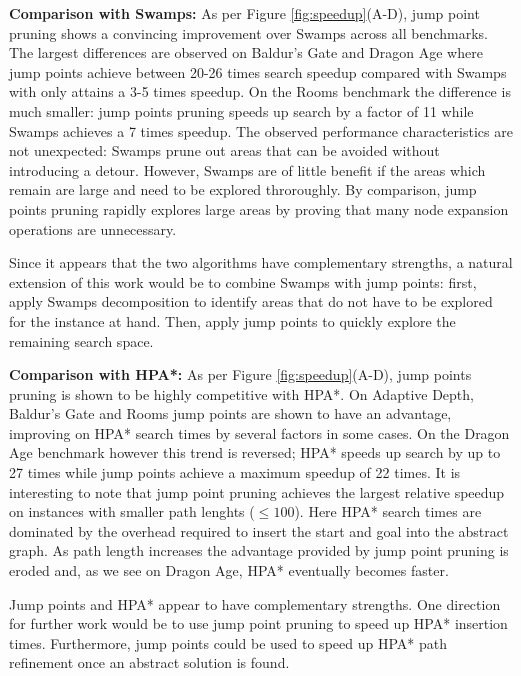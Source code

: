 \textbf{Comparison with Swamps: }
As per Figure \ref{fig:speedup}(A-D), jump point pruning shows a convincing
improvement over Swamps across all benchmarks. 
The largest differences are observed on Baldur's Gate and Dragon Age where jump 
points achieve between 20-26 times search speedup compared with Swamps with 
only attains a 3-5 times speedup.
On the Rooms benchmark the difference is much smaller: jump points pruning
speeds up search by a factor of 11 while Swamps achieves a 7 times
speedup.
The observed performance characteristics are not unexpected: Swamps prune out
areas that can be avoided without introducing a detour. However, Swamps are of
little benefit if the areas which remain are large and need to be explored 
throroughly.
By comparison, jump points pruning rapidly explores large areas by proving
that many node expansion operations are unnecessary.
\par
Since it appears that the two algorithms have complementary strengths, a natural
extension of this work would be to combine Swamps with jump points:
first, apply Swamps decomposition to identify areas that do not have to be
explored for the instance at hand. Then, apply jump points to quickly explore the
remaining search space.
\par
\textbf{Comparison with HPA*: }
As per Figure \ref{fig:speedup}(A-D), jump points pruning is shown to be 
highly competitive with HPA*.
On Adaptive Depth, Baldur's Gate and Rooms jump points are shown to have an 
advantage, improving on HPA* search times by several factors in some cases.
On the Dragon Age benchmark however this trend is reversed; HPA* speeds up
search by up to 27 times while jump points achieve a maximum speedup of 22
times.
It is interesting to note that jump point pruning achieves the largest relative
speedup on instances with smaller path lenghts
($\leq 100$). Here HPA* search times are dominated by the overhead required to
insert the start and goal into the abstract graph.
As path length increases the advantage provided by jump point pruning is eroded
and, as we see on Dragon Age, HPA* eventually becomes faster.
\par
Jump points and HPA* appear to have complementary strengths.
One direction for further work would be to use jump point pruning to speed up
HPA* insertion times. Furthermore,  jump points could be used to speed up 
HPA* path refinement once an abstract solution is found.
